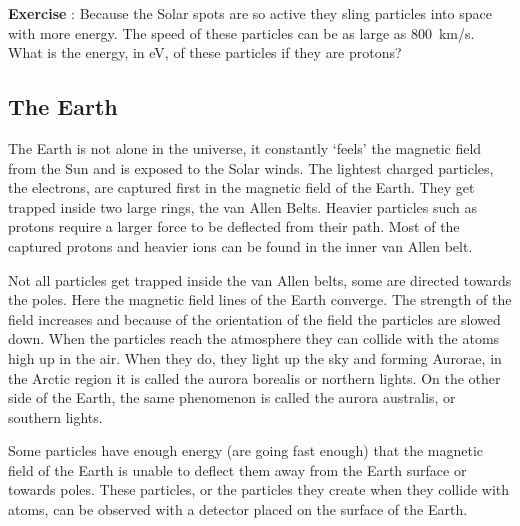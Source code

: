 \documentclass[12pt,a4paper]{article}
\numberwithin{equation}{section}
\numberwithin{figure}{section}
\newcounter{Exercise}
\numberwithin{table}{section}
\begin{document}
\begin{shaded}
\textbf{Exercise \theExercise {}} : Because the Solar spots are so active they sling particles into space with more energy. The speed of these particles can be as large as 800~km/s. What is the energy, in eV, of these particles if they are protons?\end{shaded}

\subsection{The Earth}
The Earth is not alone in the universe, it constantly `feels' the magnetic field from the Sun and is exposed to the Solar winds. The lightest charged particles, the electrons, are captured first in the magnetic field of the Earth. They get trapped inside two large rings, the van Allen Belts. Heavier particles such as protons require a larger force to be deflected from their path. Most of the captured protons and heavier ions can be found in the inner van Allen belt.

Not all particles get trapped inside the van Allen belts, some are directed towards the poles. Here the magnetic field lines of the Earth converge. The strength of the field increases and because of the orientation of the field the particles are slowed down. When the particles reach the atmosphere they can collide with the atoms high up in the air. When they do, they light up the sky and forming Aurorae, in the Arctic region it is called the aurora borealis or northern lights. On the other side of the Earth, the same phenomenon is called the aurora australis, or southern lights.

Some particles have enough energy (are going fast enough) that the magnetic field of the Earth is unable to deflect them away from the Earth surface or towards poles. These particles, or the particles they create when they collide with atoms, can be observed with a detector placed on the surface of the Earth.
\end{document}
